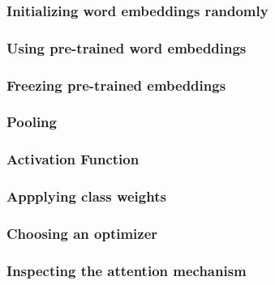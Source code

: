 \subsubsection{Initializing word embeddings randomly}
\label{subsubsec:5_experiments/3_texter/2_static/2_emb_size}


\subsubsection{Using pre-trained word embeddings}
\label{subsubsec:5_experiments/3_texter/2_static/3_pre_trained}


\subsubsection{Freezing pre-trained embeddings}
\label{subsubsec:5_experiments/3_texter/2_static/4_update_vectors}


\subsubsection{Pooling}
\label{subsubsec:5_experiments/3_texter/2_static/5_pooling}


\subsubsection{Activation Function}
\label{subsubsec:5_experiments/3_texter/2_static/6_activation}


\subsubsection{Appplying class weights}
\label{subsubsec:5_experiments/3_texter/2_static/7_weight_factor}


\subsubsection{Choosing an optimizer}
\label{subsubsec:5_experiments/3_texter/2_static/8_optimizer}


\subsubsection{Inspecting the attention mechanism}
\label{subsubsec:5_experiments/3_texter/2_static/9_attention}

